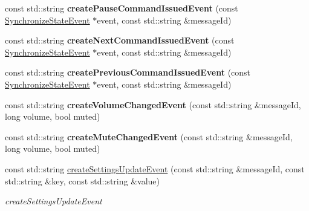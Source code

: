 \begin{DoxyCompactItemize}
const std\+::string {\bfseries create\+Pause\+Command\+Issued\+Event} (const \hyperlink{structAVSJson_1_1SynchronizeStateEvent}{Synchronize\+State\+Event} $\ast$event, const std\+::string \&message\+Id)
\item 
\mbox{\label{classAVSJson_1_1JsonFactory_a3214dad9adda71a102d1ca43ec15bbe0}} 
const std\+::string {\bfseries create\+Next\+Command\+Issued\+Event} (const \hyperlink{structAVSJson_1_1SynchronizeStateEvent}{Synchronize\+State\+Event} $\ast$event, const std\+::string \&message\+Id)
\item 
\mbox{\label{classAVSJson_1_1JsonFactory_abaa76707ececb7ca6ae18d1011e81c70}} 
const std\+::string {\bfseries create\+Previous\+Command\+Issued\+Event} (const \hyperlink{structAVSJson_1_1SynchronizeStateEvent}{Synchronize\+State\+Event} $\ast$event, const std\+::string \&message\+Id)
\item 
\mbox{\label{classAVSJson_1_1JsonFactory_af2cf888f2e24f07cc5a4ee164db9f635}} 
const std\+::string {\bfseries create\+Volume\+Changed\+Event} (const std\+::string \&message\+Id, long volume, bool muted)
\item 
\mbox{\label{classAVSJson_1_1JsonFactory_a7e344f50688f685c7a3401fc3af96bc8}} 
const std\+::string {\bfseries create\+Mute\+Changed\+Event} (const std\+::string \&message\+Id, long volume, bool muted)
\item 
const std\+::string \hyperlink{classAVSJson_1_1JsonFactory_a0a75dcab64c23b6d7512b548eaad967f}{create\+Settings\+Update\+Event} (const std\+::string \&message\+Id, const std\+::string \&key, const std\+::string \&value)
\begin{DoxyCompactList}\small\item\em create\+Settings\+Update\+Event \end{DoxyCompactList}\end{DoxyCompactItemize}
